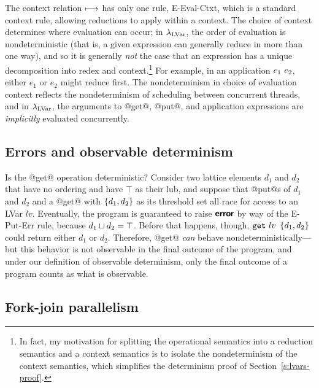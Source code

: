 The context relation $\longmapsto$ has only one rule, {\sc
  E-Eval-Ctxt}, which is a standard context rule, allowing reductions
to apply within a context.  The choice of context determines where
evaluation can occur; in $\lambda_{\textrm{LVar}}$, the order of evaluation is
nondeterministic (that is, a given expression can generally reduce in
more than one way), and so it is generally \emph{not} the case that an
expression has a unique decomposition into redex and
context.\footnote{In fact, my motivation for splitting the operational
  semantics into a reduction semantics and a context semantics is to
  isolate the nondeterminism of the context semantics, which
  simplifies the determinism proof of Section~\ref{s:lvars-proof}.}
For example, in an application $e_1~e_2$, either $e_1$ or $e_2$
might reduce first.  The nondeterminism in choice of evaluation
context reflects the nondeterminism of scheduling between concurrent
threads, and in $\lambda_{\textrm{LVar}}$, the arguments to @get@, @put@, and
application expressions are \emph{implicitly} evaluated concurrently.

\subsection{Errors and observable determinism}\label{subsection:lvars-errors-and-observable-determinism}

Is the @get@ operation deterministic?  Consider two lattice elements
$d_1$ and $d_2$ that have no ordering and have $\top$ as their lub,
and suppose that @put@s of $d_1$ and $d_2$ and a @get@ with
$\left\{d_1, d_2\right\}$ as its threshold set all race for access to an LVar
$lv$.  Eventually, the program is guaranteed to raise $\textbf{\textsf{error}}$ by way
of the {\sc E-Put-Err} rule, because $d_1 \sqcup d_2 = \top$.  Before
that happens, though, $\mbox{\texttt{get}}~lv~\left\{d_1, d_2\right\}$ could return
either $d_1$ or $d_2$.  Therefore, @get@ \emph{can} behave
nondeterministically---but this behavior is not observable in the
final outcome of the program, and under our definition of observable
determinism, only the final outcome of a program counts as what is
observable.

\subsection{Fork-join parallelism}\label{subsection:fork-join}

